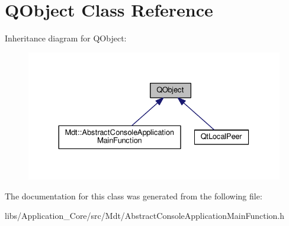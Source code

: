 \hypertarget{class_q_object}{}\section{Q\+Object Class Reference}
\label{class_q_object}


Inheritance diagram for Q\+Object\+:\nopagebreak
\begin{figure}[H]
\begin{center}
\leavevmode
\includegraphics[width=330pt]{class_q_object__inherit__graph}
\end{center}
\end{figure}


The documentation for this class was generated from the following file\+:\begin{DoxyCompactItemize}
\item 
libs/\+Application\+\_\+\+Core/src/\+Mdt/Abstract\+Console\+Application\+Main\+Function.\+h\end{DoxyCompactItemize}
